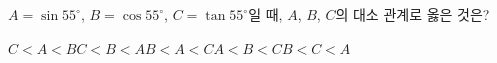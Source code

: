 $A=\sin 55^\circ$, $B=\cos 55^\circ$, $C=\tan 55^\circ$일 때, $A$, $B$, $C$의 대소 관계로 옳은 것은?
\begin{choices32}{$C<A<B$}{$C<B<A$}{$B<A<C$}{$A<B<C$}{$B<C<A$}\end{choices32}

